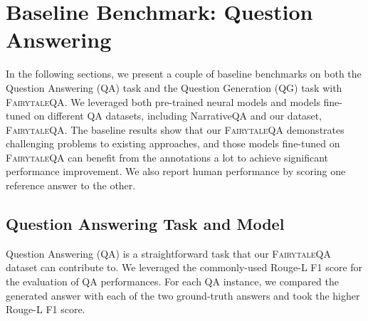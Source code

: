 \documentclass[11pt]{article}
\newcommand{\datasetname}{\textsc{FairytaleQA}\xspace}
\begin{document}
\section{Baseline Benchmark: Question Answering}

In the following sections, we present a couple of baseline benchmarks on both the Question Answering (QA) task and the Question Generation (QG) task with \datasetname. 
We leveraged both pre-trained neural models and models fine-tuned on different QA datasets, including NarrativeQA and our dataset, \datasetname. The baseline results show that our \datasetname demonstrates challenging problems to existing approaches, and those models fine-tuned on \datasetname can benefit from the annotations a lot to achieve significant performance improvement. We also report human performance by scoring one reference answer to the other.   

\subsection{Question Answering Task and Model}

Question Answering (QA) is a straightforward task that our \datasetname dataset can contribute to. We leveraged the commonly-used Rouge-L F1 score for the evaluation of QA performances. For each QA instance, we compared the generated answer with each of the two ground-truth answers and took the higher Rouge-L F1 score. 
\end{document}

